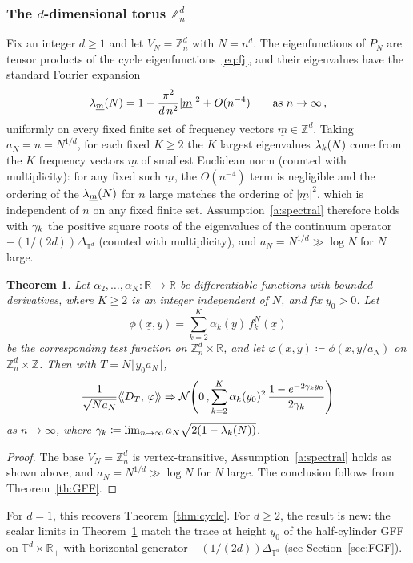 \documentclass[11pt,a4paper,reqno]{amsart}
\newtheorem{Theorem}{Theorem}[section]
\theoremstyle{definition}
\newcommand{\cN}{\ensuremath{\mathcal N}}
\newcommand{\bbR}{{\ensuremath{\mathbb R}} }
\newcommand{\bbT}{{\ensuremath{\mathbb T}} }
\newcommand{\bbZ}{{\ensuremath{\mathbb Z}} }
\newcommand{\laa}{\langle \! \langle}
\newcommand{\raa}{\rangle \! \rangle}
\let\a=\alpha \let\b=\beta   \let\d=\delta  \let\e=\varepsilon
\begin{document}
\subsubsection{The $d$-dimensional torus $\bbZ_n^d$}
Fix an integer $d \geq 1$ and let $V_N = \bbZ_n^d$ with $N = n^d$. The eigenfunctions of $P_N$ are tensor products of the cycle eigenfunctions~\eqref{eq:fj}, and their eigenvalues have the standard Fourier expansion
	\[ \lambda_{\underline m}(N) = 1 - \frac{\pi^2}{d\, n^2}|\underline m|^2 + O(n^{-4}) \qquad \text{as } n \to \infty\,, \]
uniformly on every fixed finite set of frequency vectors $\underline m \in \bbZ^d$. Taking $a_N = n = N^{1/d}$, for each fixed $K \geq 2$ the $K$ largest eigenvalues $\lambda_k(N)$ come from the $K$ frequency vectors $\underline m$ of smallest Euclidean norm (counted with multiplicity): for any fixed such $\underline m$, the $O(n^{-4})$ term is negligible and the ordering of the $\lambda_{\underline m}(N)$ for $n$ large matches the ordering of $|\underline m|^2$, which is independent of $n$ on any fixed finite set. Assumption~\ref{a:spectral} therefore holds with $\gamma_k$ the positive square roots of the eigenvalues of the continuum operator $-(1/(2d))\Delta_{\bbT^d}$ (counted with multiplicity), and $a_N = N^{1/d} \gg \log N$ for $N$ large.

\begin{Theorem}\label{thm:torus}
Let $\a_2, \ldots, \a_K : \bbR \to \bbR$ be differentiable functions with bounded derivatives, where $K \geq 2$ is an integer independent of $N$, and fix $y_0 > 0$. Let
	\[ \phi(\underline x, y) = \sum_{k=2}^K \a_k(y)\, f_k^N(\underline x) \]
be the corresponding test function on $\bbZ_n^d \times \bbR$, and let $\varphi(\underline x, y) \coloneqq \phi(\underline x, y/a_N)$ on $\bbZ_n^d \times \bbZ$. Then with $T = N \lfloor y_0 a_N \rfloor$,
	\[ \frac{1}{\sqrt{N a_N}} \laa D_T,\, \varphi \raa
	\Rightarrow \cN\!\left(0\,, \sum_{k=2}^K \a_k(y_0)^2\, \frac{1 - e^{-2\g_k y_0}}{2\g_k} \right) \]
as $n \to \infty$, where $\gamma_k \coloneqq \lim_{n\to\infty} a_N \sqrt{2(1 - \lambda_k(N))}$.
\end{Theorem}

\begin{proof}
The base $V_N = \bbZ_n^d$ is vertex-transitive, Assumption~\ref{a:spectral} holds as shown above, and $a_N = N^{1/d} \gg \log N$ for $N$ large. The conclusion follows from Theorem~\ref{th:GFF}.
\end{proof}

For $d=1$, this recovers Theorem~\ref{thm:cycle}. For $d \geq 2$, the result is new: the scalar limits in Theorem~\ref{thm:torus} match the trace at height $y_0$ of the half-cylinder GFF on $\bbT^d \times \bbR_+$ with horizontal generator $-(1/(2d))\Delta_{\bbT^d}$ (see Section~\ref{sec:FGF}).
\end{document}
